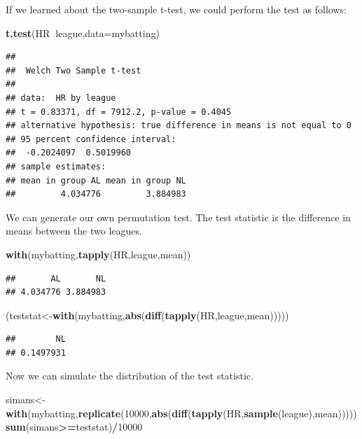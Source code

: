 \documentclass[]{book}
\newenvironment{Shaded}{\begin{snugshade}}{\end{snugshade}}
\newcommand{\KeywordTok}[1]{\textcolor[rgb]{0.13,0.29,0.53}{\textbf{#1}}}
\newcommand{\DataTypeTok}[1]{\textcolor[rgb]{0.13,0.29,0.53}{#1}}
\newcommand{\DecValTok}[1]{\textcolor[rgb]{0.00,0.00,0.81}{#1}}
\newcommand{\OperatorTok}[1]{\textcolor[rgb]{0.81,0.36,0.00}{\textbf{#1}}}
\newcommand{\NormalTok}[1]{#1}
\theoremstyle{definition}
\theoremstyle{definition}
\theoremstyle{definition}
\theoremstyle{remark}
\begin{document}
If we learned about the two-sample t-test, we could perform the test as
follows:

\begin{Shaded}
\begin{Highlighting}[]
\KeywordTok{t.test}\NormalTok{(HR}\OperatorTok{~}\NormalTok{league,}\DataTypeTok{data=}\NormalTok{mybatting)}
\end{Highlighting}
\end{Shaded}

\begin{verbatim}
## 
##  Welch Two Sample t-test
## 
## data:  HR by league
## t = 0.83371, df = 7912.2, p-value = 0.4045
## alternative hypothesis: true difference in means is not equal to 0
## 95 percent confidence interval:
##  -0.2024097  0.5019960
## sample estimates:
## mean in group AL mean in group NL 
##         4.034776         3.884983
\end{verbatim}

We can generate our own permutation test. The test statistic is the
difference in means between the two leagues.

\begin{Shaded}
\begin{Highlighting}[]
\KeywordTok{with}\NormalTok{(mybatting,}\KeywordTok{tapply}\NormalTok{(HR,league,mean))}
\end{Highlighting}
\end{Shaded}

\begin{verbatim}
##       AL       NL 
## 4.034776 3.884983
\end{verbatim}

\begin{Shaded}
\begin{Highlighting}[]
\NormalTok{(teststat<-}\KeywordTok{with}\NormalTok{(mybatting,}\KeywordTok{abs}\NormalTok{(}\KeywordTok{diff}\NormalTok{(}\KeywordTok{tapply}\NormalTok{(HR,league,mean)))))}
\end{Highlighting}
\end{Shaded}

\begin{verbatim}
##        NL 
## 0.1497931
\end{verbatim}

Now we can simulate the distribution of the test statistic.

\begin{Shaded}
\begin{Highlighting}[]
\NormalTok{simans<-}\KeywordTok{with}\NormalTok{(mybatting,}\KeywordTok{replicate}\NormalTok{(}\DecValTok{10000}\NormalTok{,}\KeywordTok{abs}\NormalTok{(}\KeywordTok{diff}\NormalTok{(}\KeywordTok{tapply}\NormalTok{(HR,}\KeywordTok{sample}\NormalTok{(league),mean)))))}
\KeywordTok{sum}\NormalTok{(simans}\OperatorTok{>=}\NormalTok{teststat)}\OperatorTok{/}\DecValTok{10000}
\end{Highlighting}
\end{Shaded}
\end{document}
